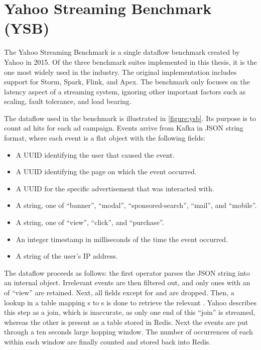 \section{Yahoo Streaming Benchmark (YSB)}\label{section:ysb}
The Yahoo Streaming Benchmark\cite{ysb} is a single dataflow benchmark created by Yahoo in 2015. Of the three benchmark suites implemented in this thesis, it is the one most widely used in the industry. The original implementation includes support for Storm, Spark, Flink, and Apex. The benchmark only focuses on the latency aspect of a streaming system, ignoring other important factors such as scaling, fault tolerance, and load bearing. \\


The dataflow used in the benchmark is illustrated in \autoref{figure:ysb}. Its purpose is to count ad hits for each ad campaign. Events arrive from Kafka in JSON string format, where each event is a flat object with the following fields:

\begin{itemize}
\item {} A UUID identifying the user that caused the event.
\item {} A UUID identifying the page on which the event occurred.
\item {} A UUID for the specific advertisement that was interacted with.
\item {} A string, one of ``banner'', ``modal'', ``sponsored-search'', ``mail'', and ``mobile''.
\item {} A string, one of ``view'', ``click'', and ``purchase''.
\item {} An integer timestamp in milliseconds of the time the event occurred.
\item {} A string of the user's IP address.
\end{itemize}

The dataflow proceeds as follows: the first operator parses the JSON string into an internal object. Irrelevant events are then filtered out, and only ones with an  of ``view'' are retained. Next, all fields except for  and  are dropped. Then, a lookup in a table mapping s to s is done to retrieve the relevant . Yahoo describes this step as a join, which is inaccurate, as only one end of this ``join'' is streamed, whereas the other is present as a table stored in Redis. Next the events are put through a ten seconds large hopping window. The number of occurrences of each  within each window are finally counted and stored back into Redis.

